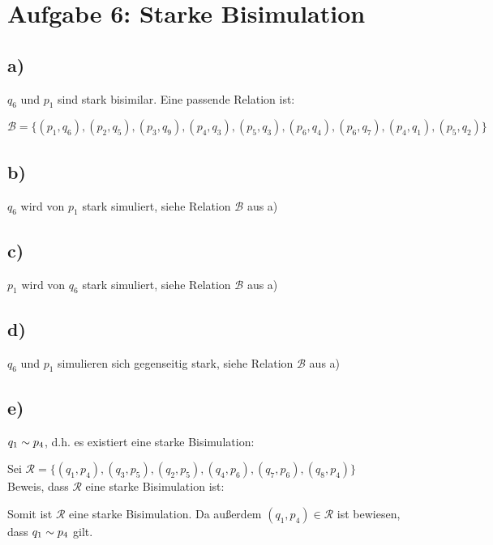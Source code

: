 \section*{Aufgabe 6: Starke Bisimulation}

\subsection*{a)}
 $q_6$ und $p_1$ sind stark bisimilar. Eine passende Relation ist:

$\mathcal{B} = \{(p_1, q_6), (p_2, q_5), (p_3, q_9), (p_4, q_3), (p_5, q_3), (p_6, q_4), (p_6, q_7), (p_4, q_1), (p_5, q_2) \}$

\subsection*{b)} $q_6$  wird von $p_1$ stark simuliert, siehe Relation $ \mathcal{B} $ aus  a)

\subsection*{c)} $p_1$  wird von $ q_6$ stark simuliert, siehe Relation $ \mathcal{B} $ aus  a)

\subsection*{d)} $q_6$ und $ p_1$ simulieren sich gegenseitig stark, siehe Relation $ \mathcal{B} $ aus  a)

\subsection*{e)} $q_1 \sim p_4$, d.h. es existiert eine starke Bisimulation:

Sei $\mathcal{R} = \{ (q_1, p_4), (q_3, p_5), (q_2, p_5), (q_4, p_6), (q_7, p_6), (q_8, p_4) \}$ \\
Beweis, dass $\mathcal{R}$ eine starke Bisimulation ist:



Somit ist $\mathcal{R}$ eine starke Bisimulation. Da außerdem $(q_1, p_4) \in \mathcal{R}$ ist bewiesen, dass $q_1 \sim p_4$ gilt.
